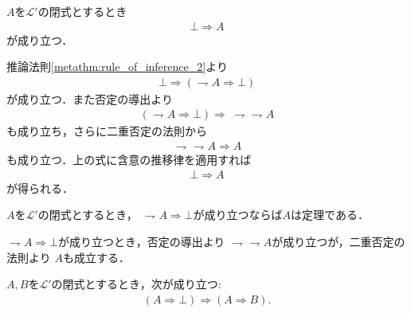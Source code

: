 	\begin{screen}
		\begin{metathm}[矛盾からはあらゆる式が導かれる]\label{metathm:contradiction_derives_any_formula}
			$A$を$\mathcal{L}'$の閉式とするとき
			\begin{align}
				\bot \Longrightarrow A
			\end{align}
			が成り立つ．
		\end{metathm}
	\end{screen}
	
	\begin{prf}
		推論法則\ref{metathm:rule_of_inference_2}より
		\begin{align}
			\bot \Longrightarrow (\rightharpoondown A \Longrightarrow \bot)
		\end{align}
		が成り立つ．また否定の導出より
		\begin{align}
			(\rightharpoondown A \Longrightarrow \bot) \Longrightarrow\ \rightharpoondown \rightharpoondown A
		\end{align}
		も成り立ち，さらに二重否定の法則から
		\begin{align}
			\rightharpoondown \rightharpoondown A \Longrightarrow A
		\end{align}
		も成り立つ．上の式に含意の推移律を適用すれば
		\begin{align}
			\bot \Longrightarrow A
		\end{align}
		が得られる．
		\QED
	\end{prf}
	
	\begin{screen}
		\begin{metathm}[背理法の原理]
			$A$を$\mathcal{L}'$の閉式とするとき，
			$\rightharpoondown A \Longrightarrow \bot$が成り立つならば$A$は定理である．
		\end{metathm}
	\end{screen}
	
	\begin{prf}
		$\rightharpoondown A \Longrightarrow \bot$が成り立つとき，否定の導出より
		$\rightharpoondown \rightharpoondown A$が成り立つが，二重否定の法則より
		$A$も成立する．
		\QED
	\end{prf}
	
	\begin{screen}
		\begin{metathm}[矛盾を導く式はあらゆる式を導く]\label{metathm:formula_leading_to_contradiction_derives_any_formula}
			$A,B$を$\mathcal{L}'$の閉式とするとき，次が成り立つ:
			\begin{align}
				(A \Longrightarrow \bot) \Longrightarrow (A \Longrightarrow B).
			\end{align}
		\end{metathm}
	\end{screen}
	
